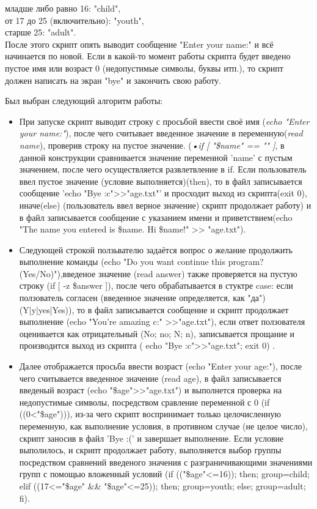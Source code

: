 младше либо равно 16: "child", \\

от 17 до 25 (включительно): "youth", \\

старше 25: "adult". \\

После этого скрипт опять выводит сообщение "Enter your name:" и всё начинается по новой. Если в какой-то момент работы скрипта будет введено пустое имя или возраст 0 (недопустимые символы, буквы итп.), то скрипт должен написать на экран "bye" и закончить свою работу. 
	
	\vspace{1cm}	
	
Был выбран следующий алгоритм работы: 
	\begin{itemize}
	\item 
	При запуске скрипт выводит строку с просьбой ввести своё имя (\textit{echo "Enter your name:"}), после чего считывает введенное значение в переменную(\textit{read name}), проверив строку на пустое значение. (\textit{•if [ "\$name" == "" ]}, в данной конструкции сравнивается значение переменной 'name' с пустым значением, после чего осуществляется развлетвление в if. Если пользователь ввел пустое значение (условие выполняется)(then), то в файл записывается сообщение 'echo "Bye :c">>"age.txt"' и просходит выход из скрипта(exit 0), иначе(else) (пользователь ввел верное значение) скрипт продолжает работу) и в файл записывается сообщение с указанием имени и приветствием(echo "The name you entered is \$name. Hi \$name!" >> "age.txt"). 
	\item
	Следующей строкой ползьвателю задаётся вопрос о желание продолжить выполнение команды (echo "Do you want continue this program? (Yes/No)"),введеное значение (read answer) также проверяется на пустую строку (if [ -z \$answer ]), после чего обрабатывается в стуктре case: если ползователь согласен (введенное значение определяется, как "да")(Y|y|yes|Yes)), то в файл записывается сообщение и скрипт продолжает выполнение (echo "You're amazing c:" >>"age.txt"), если ответ ползователя оценивается как отрицательный (No; no; N; n), записывается прощание и производится выход из скрипта ( echo "Bye :c">>"age.txt"; exit 0) .  
	\item
	Далее отображается просьба ввести возраст (echo "Enter your age:"), после чего считывается введенное значение (read age), в файл записывается введеный возраст (echo "\$age">>"age.txt") и выполнется проверка на недопустимые символы, посредством сравление переменной с 0 (if ((0<"\$age"))), из-за чего скрипт воспринимает только целочисленную переменную, как выполнение условия, в противном случае (не целое число), скрипт заносив в файл 'Bye :(' и завершает выполнение. Если условие выполилось, и скрипт продолжает работу, выполняется выбор группы посредством сравнений введеного значения с разграничивающими значениями групп с помощью вложенный условий (if (("\$age"<=16)); then;            group=child; elif ((17<="\$age" \&\& "\$age"<=25)); then;       group=youth; else; group=adult; fi).

\end{itemize}
